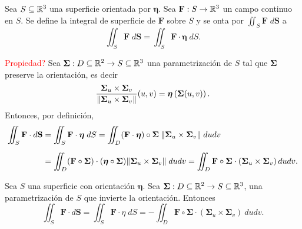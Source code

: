 \begin{definition}
    Sea $S\subseteq\mathbb{R}^3$ una superficie orientada por $\boldsymbol{\eta}$. Sea $\mathbf{F}:S\to\mathbb{R}^3$ un campo continuo en $S$. Se define la integral de superficie de $\mathbf{F}$ sobre $S$ y se onta por $\iint_S\mathbf{F}\;d\mathbf{S}$ a
    \[
        \iint_S \mathbf{F}\;d\mathbf{S}=\iint_S \mathbf{F}\cdot\boldsymbol{\eta}\;dS.
    \]
\end{definition}

\textcolor{red}{Propiedad?} Sea $\boldsymbol{\Sigma}:D\subseteq\mathbb{R}^2\to S\subseteq\mathbb{R}^3$ una parametrizaci\'on de $S$ tal que $\boldsymbol{\Sigma}$ preserve la orientaci\'on, es decir
\[
    \frac{\boldsymbol{\Sigma}_u\times\boldsymbol{\Sigma}_v}{\norm{\boldsymbol{\Sigma}_u\times\boldsymbol{\Sigma}_v}}(u,v)=\boldsymbol{\eta}\left(\boldsymbol{\Sigma}(u,v)\right).
\]
Entonces, por definici\'on, 
\begin{align*}
    \iint_S \mathbf{F}\cdot d\mathbf{S}&=\iint_S \mathbf{F}\cdot\boldsymbol{\eta}\;dS=\iint_D (\mathbf{F}\cdot\boldsymbol{\eta})\circ\boldsymbol{\Sigma}\:\norm{\boldsymbol{\Sigma}_u\times\boldsymbol{\Sigma}_v}\;dudv\\[.2cm]
    &=\iint_D (\mathbf{F}\circ\boldsymbol{\Sigma})\cdot(\boldsymbol{\eta}\circ\boldsymbol{\Sigma})\norm{\boldsymbol{\Sigma}_u\times\boldsymbol{\Sigma}_v}\;dudv=\iint_D \mathbf{F}\circ\boldsymbol{\Sigma}\cdot\left(\boldsymbol{\Sigma}_u\times\boldsymbol{\Sigma}_v\right)dudv.
\end{align*}

\begin{obs}
    Sea $S$ una superficie con orientaci\'on $\boldsymbol{\eta}$. Sea $\boldsymbol{\Sigma}:D\subseteq\mathbb{R}^2\to S\subseteq\mathbb{R}^3$, una parametrizaci\'on de $S$ que invierte la orientaci\'on. Entonces
    \[
        \iint_S \mathbf{F}\cdot d\mathbf{S} = \iint_S \mathbf{F}\cdot\eta\;dS=-\iint_D \mathbf{F}\circ\boldsymbol{\Sigma}\cdot(\boldsymbol{\Sigma}_u\times\boldsymbol{\Sigma}_v)\:dudv.
    \]
\end{obs}

